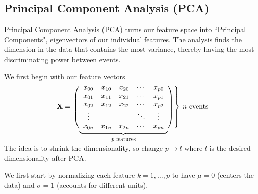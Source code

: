 \subsection{Principal Component Analysis (PCA)}
Principal Component Analysis (PCA) turns our feature space into ``Principal Components", eigenvectors of our individual features. The analysis finds the dimension in the data that contains the most variance, thereby having the most discriminating power between events.

We first begin with our feature vectors
$$\mathbf{X} = \left.\left( 
                  \vphantom{\begin{array}{c}1\\1\\1\\1\\1\end{array}}
                  \smash{\underbrace{
                      \begin{array}{ccccc}
                             x_{00}&x_{10}&x_{20}&\cdots &x_{p0}\\
                             x_{01}&x_{11}&x_{21}&\cdots &x_{p1}\\
                             x_{02}&x_{12}&x_{22}&\cdots &x_{p2}\\
                             \vdots&&&\ddots&\vdots\\
                             x_{0n}&x_{1n}&x_{2n}&\cdots &x_{pn}
                      \end{array}
                      }_{p\text{ features}}}
              \right)\right\}
              \,n\text{ events}
$$\\

The idea is to shrink the dimensionality, so change $p\rightarrow l$ where $l$ is the desired dimensionality after PCA. 

We first start by normalizing each feature $k=1,\dots,p$ to have $\mu=0$ (centers the data) and $\sigma=1$ (accounts for different units).

